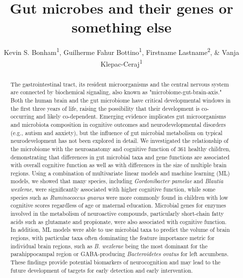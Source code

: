 \documentclass[a4paper]{article}
\title{Gut microbes and their genes or something else}
\author{Kevin S. Bonham\textsuperscript{1}, \space
Guilherme Fahur Bottino\textsuperscript{1}, 
Firstname Lastname\textsuperscript{2}, \&
Vanja Klepac-Ceraj\textsuperscript{1}
}
\begin{document}
\begin{abstract}
The gastrointestinal tract, its resident microorganisms and the central
nervous system are connected by biochemical signaling, also known as
"microbiome-gut-brain-axis." Both the human brain and the gut microbiome
have critical developmental windows in the first three years of life,
raising the possibility that their development is co-occurring and
likely co-dependent. Emerging evidence implicates gut microorganisms and
microbiota composition in cognitive outcomes and neurodevelopmental
disorders (e.g., autism and anxiety), but the influence of gut microbial
metabolism on typical neurodevelopment has not been explored in detail.
We investigated the relationship of the microbiome with the neuroanatomy
and cognitive function of 361 healthy children, demonstrating that
differences in gut microbial taxa and gene functions are associated with
overall cognitive function as well as with differences in the size of
multiple brain regions. Using a combination of multivariate linear
models and machine learning (ML) models, we showed that many species,
including \emph{Gordonibacter pamelae} and \emph{Blautia wexlerae}, were
significantly associated with higher cognitive function, while some
species such as \emph{Ruminococcus gnavus} were more commonly found in
children with low cognitive scores regardless of age or maternal
education. Microbial genes for enzymes involved in the metabolism of
neuroactive compounds, particularly short-chain fatty acids such as
glutamate and propionate, were also associated with cognitive function.
In addition, ML models were able to use microbial taxa to predict the
volume of brain regions, with particular taxa often dominating the
feature importance metric for individual brain regions, such as \emph{B.
wexlerae} being the most dominant for the parahippocampal region or
GABA-producing \emph{Bacteroidetes ovatus} for left accumbens. These
findings provide potential biomarkers of neurocognition and may lead to
the future development of targets for early detection and early
intervention.
\end{abstract}

\end{document}
